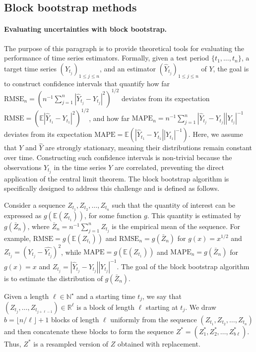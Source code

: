 \subsection{Block bootstrap methods}
\label{sec:block-bootstrap}
\paragraph{Evaluating uncertainties with block bootstrap.}
The purpose of this paragraph is to provide theoretical tools for evaluating the performance of time series estimators.
Formally, given a test period $\{t_1, \hdots, t_n\}$, a  target time series $(Y_{t_j})_{1\leq j \leq n}$, and an estimator $(\hat Y_{t_j})_{1\leq j \leq n}$ of $Y$, the goal is to construct confidence intervals that quantify how far $\mathrm{RMSE}_{n} = (n^{-1}\sum_{j=1}^n |\hat Y_{t_j} - Y_{t_j}|^2)^{1/2}$ deviates from its expectation 
$\mathrm{RMSE} = (\mathbb{E} |\hat Y_{t_1} - Y_{t_1}|^2)^{1/2}$, and  how far  $\mathrm{MAPE}_n = n^{-1}\sum_{j=1}^n |\hat Y_{t_j} - Y_{t_j}| |Y_{t_j}|^{-1}$ deviates from its expectation $\mathrm{MAPE} = \mathbb{E}( |\hat Y_{t_1} - Y_{t_1}| |Y_{t_1}|^{-1})$.
Here, we assume that $Y$ and $\hat{Y}$ are strongly stationary, meaning their distributions remain constant over time.
Constructing such confidence intervals is non-trivial because the observations $Y_{t_j}$ in the time series $Y$ are correlated, preventing the direct application of the central limit theorem.
The block bootstrap algorithm is specifically designed to address this challenge and is defined as follows.

Consider a sequence $Z_{t_1},Z_{t_2},\hdots,Z_{t_n}$ such that the quantity of interest can be expressed as $g(\mathbb{E}(Z_{t_1}))$, for some function $g$. 
This quantity is estimated by $g(\bar Z_n)$, where $\bar Z_n = n^{-1}\sum_{j=1}^n Z_{t_j}$ is the empirical mean of the sequence.
For example, $\mathrm{RMSE} = g(\mathbb E(Z_{t_1}))$ and $\mathrm{RMSE}_n = g(\bar Z_n)$ for $g(x) = x^{1/2}$ and $Z_{t_j}=(Y_{t_j}-\hat{Y_{t_j}})^2$, while $\mathrm{MAPE} = g(\mathbb E(Z_{t_1}))$ and  $\mathrm{MAPE}_n = g(\bar Z_n)$  for $g(x) = x$ and $Z_{t_j}=|\hat Y_{t_j} - Y_{t_j}| |Y_{t_j}|^{-1}$.
The goal of the block bootstrap algorithm is to estimate the distribution of $g(\bar Z_n)$.

Given a length $\ell \in \mathbb N^\star$ and a starting time $t_j$, we say that $(Z_{t_j}, \hdots, Z_{t_{j+\ell-1}})\in \mathbb R^\ell$ is a block of length $\ell$ starting at $t_j$. We draw  $b = \lfloor n/\ell\rfloor +1$ blocks of length $\ell$ uniformly from the sequence  $(Z_{t_1}, Z_{t_2}, \dots, Z_{t_n})$ and then concatenate these blocks to form the sequence $Z^\ast = (Z_1^\ast, Z_2^\ast, \dots, Z_{b\ell}^\ast)$.
Thus, $Z^\ast$ is a resampled version of $Z$  obtained with replacement.

